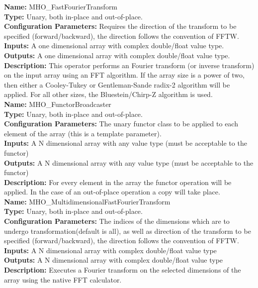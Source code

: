\noindent \textbf{Name:} MHO\_FastFourierTransform \\
\textbf{Type:} Unary, both in-place and out-of-place. \\
\textbf{Configuration Parameters:} Requires the direction of the transform to be specified (forward/backward), the direction follows the convention of FFTW.\\
\textbf{Inputs:} A one dimensional array with complex double/float value type. \\
\textbf{Outputs:} A one dimensional array with complex double/float value type. \\
\textbf{Description:} This operator performs an Fourier transform (or inverse transform) on the input array using an FFT algorithm. If the array size is a power of two, then either a Cooley-Tukey or Gentleman-Sande radix-2 algorithm will be applied. For all other sizes, the Bluestein/Chirp-Z algorithm is used.\\



\noindent \textbf{Name:}  MHO\_FunctorBroadcaster \\
\textbf{Type:} Unary, both in-place and out-of-place. \\
\textbf{Configuration Parameters:} The unary functor class to be applied to each element of the array (this is a template parameter).\\
\textbf{Inputs:} A N dimensional array with any value type (must be acceptable to the functor)\\
\textbf{Outputs:} A N dimensional array with any value type (must be acceptable to the functor)\\
\textbf{Description:} For every element in the array the functor operation will be applied. In the case of an out-of-place operation a copy will take place.\\


\noindent \textbf{Name:} MHO\_MultidimensionalFastFourierTransform \\
\textbf{Type:} Unary, both in-place and out-of-place. \\
\textbf{Configuration Parameters:} The indices of the dimensions which are to undergo transformation(default is all), as well as direction of the transform to be specified (forward/backward), the direction follows the convention of FFTW.\\
\textbf{Inputs:} A N dimensional array with complex double/float value type \\
\textbf{Outputs:} A N dimensional array with complex double/float value type \\
\textbf{Description:} Executes a Fourier transform on the selected dimensions of the array using the native FFT calculator.\\


